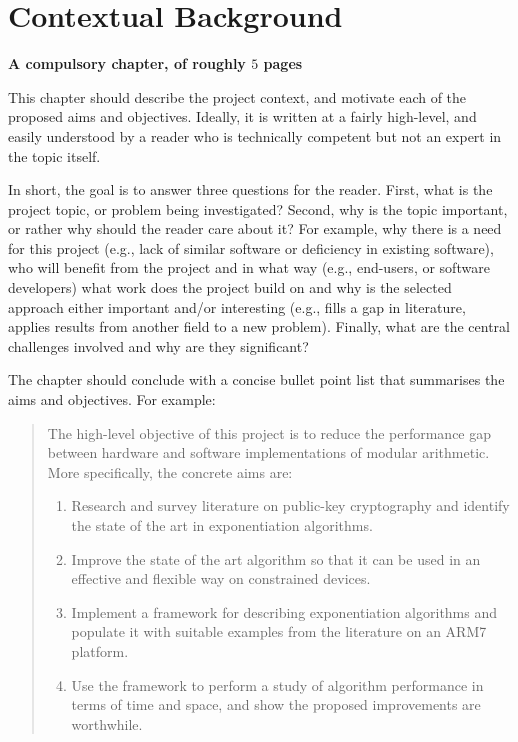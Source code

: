 \documentclass[
author={Veyndan Stuart},
supervisor={Prof. Dave Cliff},
degree={MEng},
title={Some Structural Guidelines for CS MEng Dissertations},
subtitle={},
type={enterprise},
year={2019}
]{thesis}
\begin{document}
    \mainmatter


    \chapter{Contextual Background}
    \label{chap:context}

    {\bf A compulsory chapter, of roughly $5$ pages}
    \vspace{1cm}

    \noindent
    This chapter should describe the project context, and motivate each of
    the proposed aims and objectives. Ideally, it is written at a fairly
    high-level, and easily understood by a reader who is technically
    competent but not an expert in the topic itself.

    In short, the goal is to answer three questions for the reader. First,
    what is the project topic, or problem being investigated? Second, why
    is the topic important, or rather why should the reader care about it?
    For example, why there is a need for this project (e.g., lack of similar
    software or deficiency in existing software), who will benefit from the
    project and in what way (e.g., end-users, or software developers) what
    work does the project build on and why is the selected approach either
    important and/or interesting (e.g., fills a gap in literature, applies
    results from another field to a new problem). Finally, what are the
    central challenges involved and why are they significant?

    The chapter should conclude with a concise bullet point list that
    summarises the aims and objectives. For example:

    \begin{quote}
        \noindent
        The high-level objective of this project is to reduce the performance
        gap between hardware and software implementations of modular arithmetic.
        More specifically, the concrete aims are:

        \begin{enumerate}
            \item Research and survey literature on public-key cryptography and
            identify the state of the art in exponentiation algorithms.
            \item Improve the state of the art algorithm so that it can be used
            in an effective and flexible way on constrained devices.
            \item Implement a framework for describing exponentiation algorithms
            and populate it with suitable examples from the literature on
            an ARM7 platform.
            \item Use the framework to perform a study of algorithm performance
            in terms of time and space, and show the proposed improvements
            are worthwhile.
        \end{enumerate}
    \end{quote}
\end{document}
